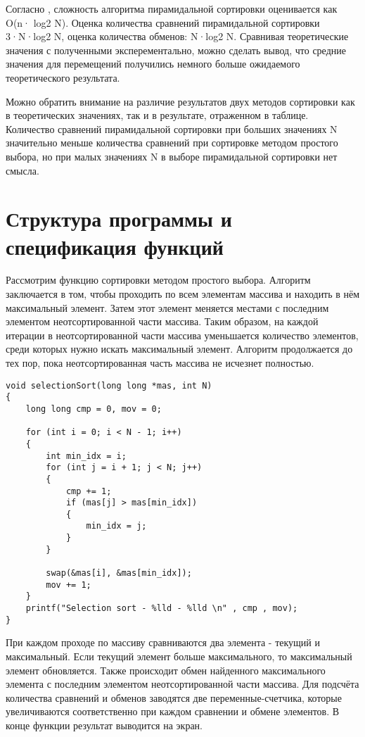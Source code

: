 \documentclass[a4paper,12pt,titlepage,finall]{article}
\begin{document}
Согласно \cite{cormen}, сложность алгоритма пирамидальной сортировки оценивается как O(n· log2 N). Оценка количества сравнений пирамидальной сортировки 3·N·log2 N, оценка количества обменов: N·log2 N. Сравнивая теоретические значения с полученными эксперементально, можно сделать вывод, что средние значения для перемещений получились немного больше ожидаемого теоретического результата. \par

Можно обратить внимание на различие результатов двух методов сортировки как в теоретических значениях, так и в результате, отраженном в таблице. Количество сравнений пирамидальной сортировки при больших значениях N значительно меньше количества сравнений при сортировке методом простого выбора, но при малых значениях N в выборе пирамидальной сортировки нет смысла.\par

\newpage

\section{Структура программы и спецификация функций}

Рассмотрим функцию сортировки методом простого выбора. Алгоритм заключается в том, чтобы проходить по всем элементам массива и находить в нём максимальный элемент. Затем этот элемент меняется местами с последним элементом неотсортированной части массива. Таким образом, на каждой итерации в неотсортированной части массива уменьшается количество элементов, среди которых нужно искать максимальный элемент. Алгоритм продолжается до тех пор, пока неотсортированная часть массива не исчезнет полностью.\par

\lstset{language=c}          
\begin{lstlisting} 
void selectionSort(long long *mas, int N)
{
    long long cmp = 0, mov = 0;

    for (int i = 0; i < N - 1; i++)
    {
        int min_idx = i;
        for (int j = i + 1; j < N; j++)
        {
            cmp += 1;
            if (mas[j] > mas[min_idx])
            {
                min_idx = j;
            }
        }

        swap(&mas[i], &mas[min_idx]);
        mov += 1;
    }
    printf("Selection sort - %lld - %lld \n" , cmp , mov);
}
\end{lstlisting}\par

При каждом проходе по массиву сравниваются два элемента - текущий и максимальный. Если текущий элемент больше максимального, то максимальный элемент обновляется. Также происходит обмен найденного максимального элемента с последним элементом неотсортированной части массива. Для подсчёта количества сравнений и обменов заводятся две переменные-счетчика, которые увеличиваются соответственно при каждом сравнении и обмене элементов. В конце функции результат выводится на экран.\par
\end{document}
